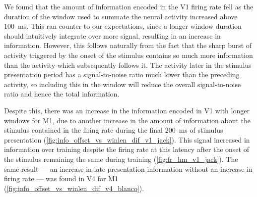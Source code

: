 We found that the amount of information encoded in the \ac{V1} firing rate fell as the duration of the window used to summate the neural activity increased above \SI{100}{\milli\second}.
This ran counter to our expectations, since a longer window duration should intuitively integrate over more signal, resulting in an increase in information.
However, this follows naturally from the fact that the sharp burst of activity triggered by the onset of the stimulus contains so much more information than the activity which subsequently follows it.
The activity later in the stimulus presentation period has a signal-to-noise ratio much lower than the preceding activity, so including this in the window will reduce the overall signal-to-noise ratio and hence the total information.

Despite this, there was an increase in the information encoded in \ac{V1} with longer windows for \ac{M1}, due to another increase in the amount of information about the stimulus contained in the firing rate during the final \SI{200}{\milli\second} of stimulus presentation (\autoref{fig:info_offset_vs_winlen_dif_v1_jack}).
This signal increased in information over training despite the firing rate at this latency after the onset of the stimulus remaining the same during training (\autoref{fig:fr_hm_v1_jack}).
The same result --- an increase in late-presentation information without an increase in firing rate --- was found in \ac{V4} for \ac{M1} (\autoref{fig:info_offset_vs_winlen_dif_v4_blanco}).

